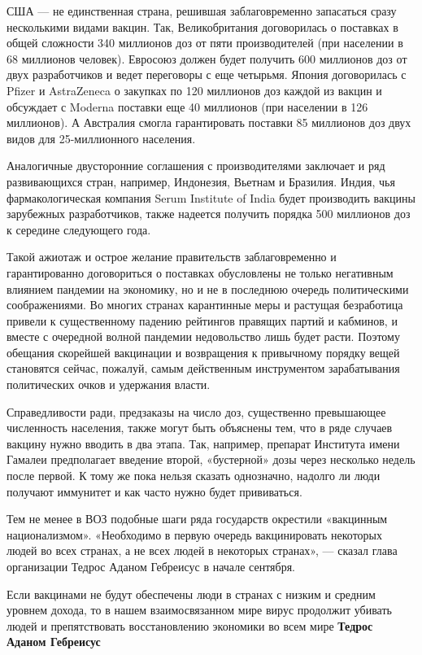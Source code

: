 США --- не единственная страна, решившая заблаговременно запасаться сразу
несколькими видами вакцин. Так, Великобритания договорилась о поставках в общей
сложности 340 миллионов доз от пяти производителей (при населении в 68
миллионов человек). Евросоюз должен будет получить 600 миллионов доз от двух
разработчиков и ведет переговоры с еще четырьмя. Япония договорилась с Pfizer и
AstraZeneca о закупках по 120 миллионов доз каждой из вакцин и обсуждает с
Moderna поставки еще 40 миллионов (при населении в 126 миллионов). А Австралия
смогла гарантировать поставки 85 миллионов доз двух видов для 25-миллионного
населения.

Аналогичные двусторонние соглашения с производителями заключает и ряд
развивающихся стран, например, Индонезия, Вьетнам и Бразилия. Индия, чья
фармакологическая компания Serum Institute of India будет производить вакцины
зарубежных разработчиков, также надеется получить порядка 500 миллионов доз к
середине следующего года.

Такой ажиотаж и острое желание правительств заблаговременно и гарантированно
договориться о поставках обусловлены не только негативным влиянием пандемии на
экономику, но и не в последнюю очередь политическими соображениями. Во многих
странах карантинные меры и растущая безработица привели к существенному падению
рейтингов правящих партий и кабминов, и вместе с очередной волной пандемии
недовольство лишь будет расти. Поэтому обещания скорейшей вакцинации и
возвращения к привычному порядку вещей становятся сейчас, пожалуй, самым
действенным инструментом зарабатывания политических очков и удержания власти.

Справедливости ради, предзаказы на число доз, существенно превышающее
численность населения, также могут быть объяснены тем, что в ряде случаев
вакцину нужно вводить в два этапа. Так, например, препарат Института имени
Гамалеи предполагает введение второй, «бустерной» дозы через несколько недель
после первой. К тому же пока нельзя сказать однозначно, надолго ли люди
получают иммунитет и как часто нужно будет прививаться.

Тем не менее в ВОЗ подобные шаги ряда государств окрестили «вакцинным
национализмом». «Необходимо в первую очередь вакцинировать некоторых людей во
всех странах, а не всех людей в некоторых странах», --- сказал глава организации
Тедрос Аданом Гебреисус в начале сентября.

Если вакцинами не будут обеспечены люди в странах с низким и средним уровнем
дохода, то в нашем взаимосвязанном мире вирус продолжит убивать людей и
препятствовать восстановлению экономики во всем мире
\textbf{Тедрос Аданом Гебреисус}

